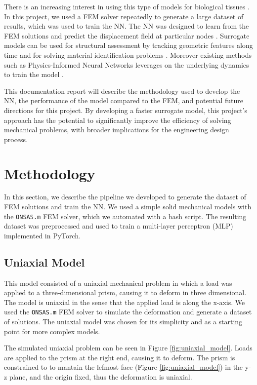 \documentclass[oneside,a4paper,english,links]{amca}
\begin{document}
There is an increasing interest in using this type of models for biological tissues \citep{pellicer2020real}. In this project, we used a FEM solver repeatedly to generate a large dataset of results, which was used to train the NN. 
%
The NN was designed to learn from the FEM solutions and predict the displacement field at particular nodes \cite{yang2022tracker}. Surrogate models can be used for structural assessment by tracking geometric features along time \cite{zhu2023visual} and for solving material identification problems \cite{steuben2015inverse}.
%
Moreover existing methods such as Physics-Informed Neural Networks leverages on the underlying dynamics to train the model \citep{raissi2017physics}. 

This documentation report will describe the methodology used to develop the NN, the performance of the model compared to the FEM, and potential future directions for this project. By developing a faster surrogate model, this project's approach has the potential to significantly improve the efficiency of solving mechanical problems, with broader implications for the engineering design process.

\section{Methodology}
In this section, we describe the pipeline we developed to generate the dataset of FEM solutions and train the NN. We used a simple solid mechanical models with the \texttt{ONSAS.m} FEM solver, which we automated with a bash script. The resulting dataset was preprocessed and used to train a multi-layer perceptron (MLP) implemented in PyTorch.

\subsection{Uniaxial Model}
This model consisted of a uniaxial mechanical problem in which a load was applied to a three-dimensional prism, causing it to deform in three dimensional. The model is uniaxial in the sense that the applied load is along the x-axis. We used the \texttt{ONSAS.m} FEM solver to simulate the deformation and generate a dataset of solutions. The uniaxial model was chosen for its simplicity and as a starting point for more complex models.

The simulated uniaxial problem can be seen in Figure \ref{fig:uniaxial_model}. Loads are applied to the prism at the right end, causing it to deform. The prism is constrained to to mantain the lefmost face (Figure \ref{fig:uniaxial_model}) in the y-z plane, and the origin fixed, thus the deformation is uniaxial.
\end{document}
